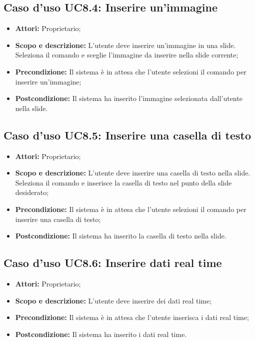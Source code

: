 \subsection{Caso d'uso UC8.4: Inserire un'immagine}
\begin{itemize}
\item \textbf{Attori:} Proprietario;
\item \textbf{Scopo e descrizione:} L'utente deve inserire un'immagine in una slide. Seleziona il comando e sceglie l'immagine da inserire nella slide corrente;
\item \textbf{Precondizione:} Il sistema è in attesa che l'utente selezioni il comando per inserire un'immagine;
\item \textbf{Postcondizione:} Il sistema ha inserito l'immagine selezionata dall'utente nella slide.
\end{itemize}


\subsection{Caso d'uso UC8.5: Inserire una casella di testo}
\begin{itemize}
\item \textbf{Attori:} Proprietario;
\item \textbf{Scopo e descrizione:} L'utente deve inserire una casella di testo nella slide. Seleziona il comando e inserisce la casella di testo nel punto della slide desiderato;
\item \textbf{Precondizione:} Il sistema è in attesa che l'utente selezioni il comando per inserire una casella di testo;
\item \textbf{Postcondizione:} Il sistema ha inserito la casella di testo nella slide.
\end{itemize}


\subsection{Caso d'uso UC8.6: Inserire dati real time}
\begin{itemize}
	\item \textbf{Attori:} Proprietario;
	\item \textbf{Scopo e descrizione:} L'utente deve inserire dei dati real time;
	\item \textbf{Precondizione:} Il sistema è in attesa che l'utente inserisca i dati real time;
	\item \textbf{Postcondizione:} Il sistema ha inserito i dati real time.
\end{itemize}


